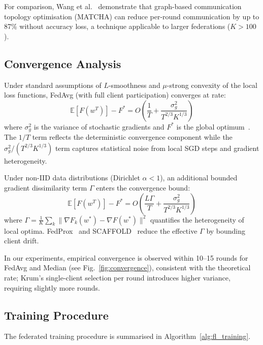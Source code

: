\documentclass[conference]{IEEEtran}
\begin{document}
For comparison, Wang et al.~\cite{wang2020matcha} demonstrate that
graph-based communication topology optimisation (MATCHA) can reduce
per-round communication by up to 87\% without accuracy loss, a
technique applicable to larger federations ($K > 100$).

\subsection{Convergence Analysis}

Under standard assumptions of $L$-smoothness and
$\mu$-strong convexity of the local loss functions, FedAvg
(with full client participation) converges at rate:
\begin{equation}
\mathbb{E}[F(w^T)] - F^* = O\!\left(\frac{1}{T} +
  \frac{\sigma_g^2}{T^{2/3} K^{1/3}}\right)
\label{eq:convergence}
\end{equation}
where $\sigma_g^2$ is the variance of stochastic gradients and
$F^*$ is the global optimum~\cite{li2020fedprox,li2020convergence}.
The $1/T$ term reflects the deterministic convergence component while
the $\sigma_g^2 / (T^{2/3} K^{1/3})$ term captures statistical noise
from local SGD steps and gradient heterogeneity.

Under non-IID data distributions (Dirichlet $\alpha < 1$), an
additional bounded gradient dissimilarity term $\Gamma$ enters the
convergence bound:
\begin{equation}
\mathbb{E}[F(w^T)] - F^* = O\!\left(\frac{L \Gamma}{T} +
  \frac{\sigma_g^2}{T^{2/3} K^{1/3}}\right)
\label{eq:convergence_noniid}
\end{equation}
where $\Gamma = \frac{1}{K}\sum_k \|\nabla F_k(w^*) -
\nabla F(w^*)\|^2$ quantifies the heterogeneity of local optima.
FedProx~\cite{li2020fedprox} and SCAFFOLD~\cite{karimireddy2020scaffold}
reduce the effective $\Gamma$ by bounding client drift.

In our experiments, empirical convergence is observed within 10--15
rounds for FedAvg and Median (see Fig.~\ref{fig:convergence}),
consistent with the theoretical rate; Krum's single-client selection
per round introduces higher variance, requiring slightly more rounds.

\subsection{Training Procedure}

The federated training procedure is summarised in
Algorithm~\ref{alg:fl_training}.
\end{document}
